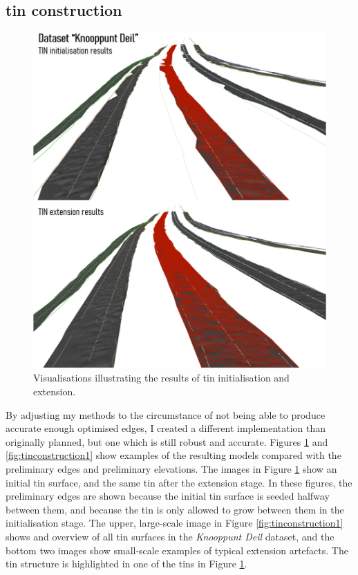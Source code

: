 \subsection{\ac{tin} construction}
\label{sub:r_tinconstruction}

\begin{figure}
    \centering
    \includegraphics[width=\linewidth]{final_report/figs/tinconstruction0.png}
    \caption{Visualisations illustrating the results of \ac{tin} initialisation and extension.}
    \label{fig:tinconstruction0}
\end{figure}

By adjusting my methods to the circumstance of not being able to produce accurate enough optimised edges, I created a different implementation than originally planned, but one which is still robust and accurate. Figures \ref{fig:tinconstruction0} and \ref{fig:tinconstruction1} show examples of the resulting models compared with the preliminary edges and preliminary elevations. The images in Figure \ref{fig:tinconstruction0} show an initial \ac{tin} surface, and the same \ac{tin} after the extension stage. In these figures, the preliminary edges are shown because the initial \ac{tin} surface is seeded halfway between them, and because the \ac{tin} is only allowed to grow between them in the initialisation stage. The upper, large-scale image in Figure \ref{fig:tinconstruction1} shows and overview of all \ac{tin} surfaces in the \textit{Knooppunt Deil} dataset, and the bottom two images show small-scale examples of typical extension artefacts. The \ac{tin} structure is highlighted in one of the \ac{tin}s in Figure \ref{fig:tinconstruction0}.

